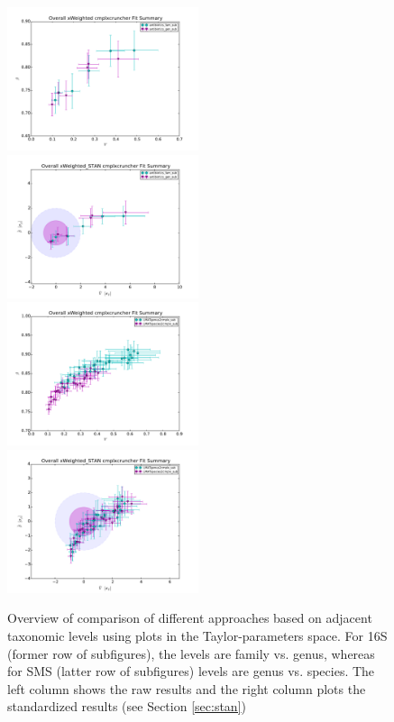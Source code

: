 \documentclass[12pt,oneside,letterpaper]{article}
\begin{document}
\begin{figure} 
  \includegraphics[width=0.5\textwidth]{results/taxalevel/sum_raw_16S.pdf}
  \includegraphics[width=0.5\textwidth]{results/taxalevel/sum_sta_16S.pdf}
  \includegraphics[width=0.5\textwidth]{results/taxalevel/sum_raw_SMS.pdf} 
  \includegraphics[width=0.5\textwidth]{results/taxalevel/sum_sta_SMS.pdf}
\caption{Overview of comparison of different approaches based on adjacent taxonomic levels using plots in the Taylor-parameters space. For 16S (former row of subfigures), the levels are family vs. genus, whereas for SMS (latter row of subfigures) levels are genus vs. species. The left column shows the raw results and the right column plots the standardized results (see Section \ref{sec:stan})}
\label{fig:taxlev1}
\end{figure}
\end{document}
